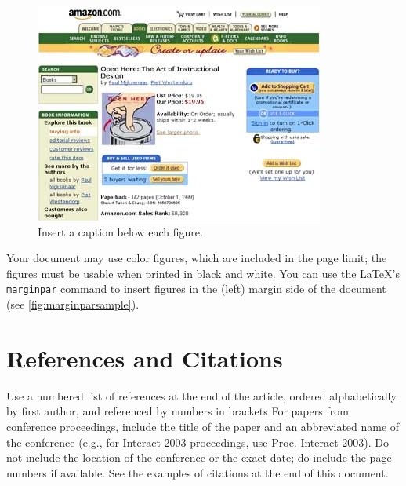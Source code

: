 \documentclass{chi-ext}
\begin{document}
\begin{figure}
  \centering
  \includegraphics[width=\linewidth]{sample.jpg}
  \caption{Insert a caption below each figure.}
  \label{fig:sample}
\end{figure}


Your document may use color figures, which are included in the page limit; the figures must be usable when printed in black and white.
You can use the \LaTeX's \texttt{marginpar} command to insert figures in the (left) margin side of the document (see \autoref{fig:marginparsample}).


\section{References and Citations}
Use a numbered list of references at the end of the article, ordered alphabetically by first author, and referenced by numbers in brackets \cite{Anderson92,Klemmer02,Mather00,Zellweger01}
For papers from conference proceedings, include the title of the paper and an abbreviated name of the conference (e.g., for Interact 2003 proceedings, use Proc. Interact 2003). 
Do not include the location of the conference or the exact date; do include the page numbers if available. 
See the examples of citations at the end of this document. 
\end{document}
